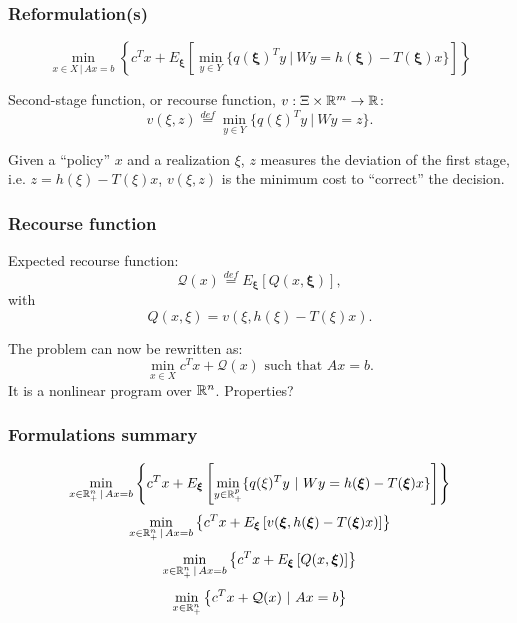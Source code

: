 \documentclass{beamer}
\def\bxi{\boldsymbol\xi}
\def\bxi{\boldsymbol\xi}
\begin{document}
\begin{frame}
\frametitle{Reformulation(s)}

\[
\min_{x \in X \,|\, Ax = b} \left\lbrace c^Tx + E_{\bxi} \left[ \min_{y \in Y} \lbrace q(\bxi)^Ty \ |\ Wy = h(\bxi) - T(\bxi)x \rbrace \right] \right\rbrace 
\]

\mbox{}

{\red Second-stage function}, or {\red recourse function}, $v: \Xi \times {\mathbb{R}}^m \rightarrow {\mathbb{R}}$:
\[
v(\xi, z) \overset{def}{=} \min_{y \in Y} \lbrace q(\xi)^Ty \ |\ Wy = z \rbrace.
\]

\mbox{}

Given a ``policy'' $x$ and a realization $\xi$, $z$ measures the deviation of the first stage, i.e. $z = h(\xi) - T(\xi)x$, $v(\xi, z)$ is the minimum cost to ``correct'' the decision. %

\end{frame}

\begin{frame}
\frametitle{Recourse function}

{\red Expected recourse function}:
\[
\mathcal{Q}(x) \overset{def}{=} E_{\bxi}[Q(x,\bxi)],
\]
with
\[
Q(x, \xi) = v(\xi, h(\xi)-T(\xi)x).
\]

\mbox{}

The problem can now be rewritten as:
\[
\min_{x \in X} c^Tx + \mathcal{Q}(x) \mbox{ such that } Ax = b.
\]
It is a nonlinear program over ${\mathbb{R}}^n$. Properties?
\end{frame}

\begin{frame}
\frametitle{Formulations summary}

\[
\min_{x \in \RR^n_+ \,|\, Ax = b} \left\lbrace c^Tx + E_{\bxi} \left[ \min_{y \in \RR^p_+} \lbrace q(\xi)^Ty \ |\ Wy = h(\bxi) - T(\bxi)x \rbrace \right] \right\rbrace 
\]
\[
\min_{x \in \RR^n_+ \,|\, Ax = b} \left\lbrace c^Tx + E_{\bxi}
  \left[  v(\bxi, h(\bxi)-T(\bxi)x) \right] \right\rbrace 
\]
\[
\min_{x \in \RR^n_+ \,|\, Ax = b} \left\lbrace c^Tx + E_{\bxi} \left[ Q(x,\bxi) \right] \right\rbrace 
\]
\[
\min_{x \in {\mathbb{R}}^n_+} \left\lbrace c^Tx + \mathcal{Q}(x)
  \ |\ Ax = b \right\rbrace 
\]

\end{frame}
\end{document}
